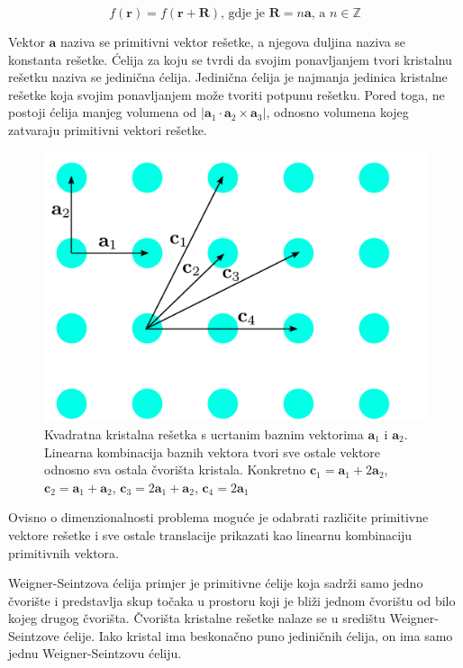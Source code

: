 \documentclass[utf8, seminar]{fer}
\begin{document}
\begin{equation}
	f(\mathbf{r}) = f(\mathbf{r} + \mathbf{R}) \text{, gdje je }{\mathbf{R} =
	n\mathbf{a}} \text{, a } n \in \mathbb{Z}
\end{equation}

Vektor $\mathbf{a}$ naziva se primitivni vektor rešetke, a njegova duljina
naziva se konstanta rešetke. Ćelija za koju se tvrdi da svojim ponavljanjem
tvori kristalnu rešetku naziva se jedinična ćelija. Jedinična ćelija je
najmanja jedinica kristalne rešetke koja svojim ponavljanjem može tvoriti
potpunu rešetku. Pored toga, ne postoji ćelija manjeg volumena od
${|\mathbf{a}_1 \cdot \mathbf{a}_2 \times \mathbf{a}_3|}$, odnosno volumena
kojeg zatvaraju primitivni vektori rešetke.

\begin{figure}[h]
	\centering
	\includegraphics[width = 1.0\linewidth]{./images/crystal_lattice.pdf}
	\caption{Kvadratna kristalna rešetka s ucrtanim baznim vektorima
	$\mathbf{a}_1$ i $\mathbf{a}_2$. Linearna kombinacija baznih vektora
	tvori sve ostale vektore odnosno sva ostala čvorišta kristala. Konkretno
	${\mathbf{c}_1 = \mathbf{a}_1 + 2 \mathbf{a}_2}$,
	${\mathbf{c}_2 = \mathbf{a}_1 + \mathbf{a}_2}$,
	${\mathbf{c}_3 = 2 \mathbf{a}_1 + \mathbf{a}_2}$,
	${\mathbf{c}_4 = 2 \mathbf{a}_1}$}
	\label{fig:crystal_lattice}
\end{figure}

Ovisno o dimenzionalnosti problema moguće je odabrati različite primitivne
vektore rešetke i sve ostale translacije prikazati kao linearnu kombinaciju
primitivnih vektora.

Weigner-Seintzova ćelija primjer je primitivne ćelije koja sadrži samo jedno
čvorište i predstavlja skup točaka u prostoru koji je bliži jednom čvorištu
od bilo kojeg drugog čvorišta. Čvorišta kristalne rešetke nalaze se u središtu
Weigner-Seintzove ćelije. Iako kristal ima beskonačno puno jediničnih ćelija,
on ima samo jednu Weigner-Seintzovu ćeliju.
\end{document}
